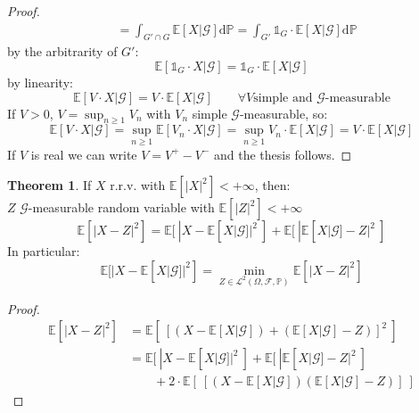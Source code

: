 \documentclass[10pt,a4paper]{article}
\theoremstyle{definition}
\newtheorem{teo}{Theorem}[section]
\newcommand{\ind}{\mathds{1}}
\begin{document}
\begin{enumerate}
\begin{proof}
\begin{equation*}
\begin{split}
		&=\int_{G'\cap G}\mathbb{E}[X|\mathcal{G}]\mathrm{d}\mathbb{P}=
		\int_{G'}\ind_G \cdot\mathbb{E}[ X|\mathcal{G}]\mathrm{d}\mathbb{P}
	\end{split}
\end{equation*}
by the arbitrarity of $G'$: 
	\begin{equation*}
	\mathbb{E}[\ind_G\cdot X|\mathcal{G}]=\ind_G\cdot \mathbb{E}[X|\mathcal{G}]
\end{equation*}
by linearity:
\begin{equation*}
	\mathbb{E}[V\cdot X|\mathcal{G}]=V\cdot \mathbb{E}[X|\mathcal{G}] \qquad\forall V \text{simple and  $\mathcal{G}$-measurable}  
\end{equation*} 
If $V>0$, $V=\sup_{n\geq 1}V_n$ with $V_n$ simple   $\mathcal{G}$-measurable, so:
\begin{equation*}
	\mathbb{E}[V\cdot X|\mathcal{G}]=
	\sup_{n\geq 1}\mathbb{E}[V_n\cdot X|\mathcal{G}]=
	\sup_{n\geq 1}V_n\cdot \mathbb{E}[X|\mathcal{G}] =
	V\cdot \mathbb{E}[X|\mathcal{G}]
\end{equation*} 
If $V$ is real we can write $V=V^{+}-V^{-}$ and the thesis follows.
\end{proof}
\begin{teo}
If $X$ r.r.v. with $\mathbb{E}[|X|^2]<+\infty $, then:\\
$Z$ $\mathcal{G}$-measurable random variable with $\mathbb{E}[|Z|^2]<+\infty$\\
\begin{equation*}
	\mathbb{E}[|X-Z|^2]=\mathbb{E}[\ |X-\mathbb{E}[X|\mathcal{G}]|^2\ ]+\mathbb{E}[\ |\mathbb{E}[X|\mathcal{G}]-Z|^2\ ]
\end{equation*}
In particular:
\begin{equation*}
	\mathbb{E}[|X-\mathbb{E}[X|\mathcal{G}]|^2]=\min_{Z\in\mathcal{L}^2(\Omega,\mathcal{F},\mathbb{P})}\mathbb{E}[|X-Z|^2]
\end{equation*}
\end{teo}
\begin{proof}
	\begin{equation*}
		\begin{split}
			\mathbb{E}[|X-Z|^2]&=\mathbb{E}[\ [(X-\mathbb{E}[X|\mathcal{G}])+(\mathbb{E}[X|\mathcal{G}]-Z)]^2\ ]\\
			&=\mathbb{E}[\ |X-\mathbb{E}[X|\mathcal{G}]|^2\ ]+\mathbb{E}[\ |\mathbb{E}[X|\mathcal{G}]-Z|^2\ ]\\
			&\qquad+2\cdot\mathbb{E}[\ [(X-\mathbb{E}[X|\mathcal{G}])(\mathbb{E}[X|\mathcal{G}]-Z)]\ ]
		\end{split}		

\end{equation*}
\end{proof}
\end{enumerate}
\end{document}
